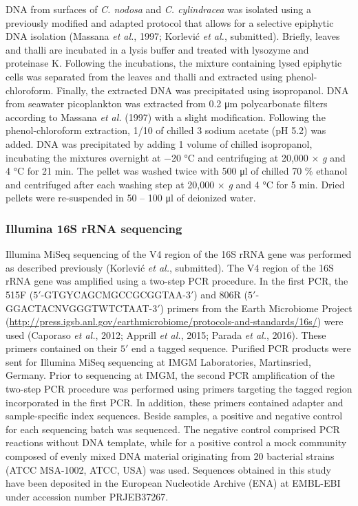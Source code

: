 \documentclass[12pt,]{article}
\begin{document}
DNA from surfaces of \emph{C. nodosa} and \emph{C. cylindracea} was
isolated using a previously modified and adapted protocol that allows
for a selective epiphytic DNA isolation (Massana \emph{et al.}, 1997;
Korlević \emph{et al.}, submitted). Briefly, leaves and thalli are
incubated in a lysis buffer and treated with lysozyme and proteinase K.
Following the incubations, the mixture containing lysed epiphytic cells
was separated from the leaves and thalli and extracted using
phenol-chloroform. Finally, the extracted DNA was precipitated using
isopropanol. DNA from seawater picoplankton was extracted from 0.2
\si{\um} polycarbonate filters according to Massana \emph{et al.} (1997)
with a slight modification. Following the phenol-chloroform extraction,
1/10 of chilled 3 \si{\Molar} sodium acetate (pH 5.2) was added. DNA was
precipitated by adding 1 volume of chilled isopropanol, incubating the
mixtures overnight at \num{-20} \si{\degreeCelsius} and centrifuging at
20,000 × \emph{g} and 4 \si{\degreeCelsius} for 21 \si{\minute}. The
pellet was washed twice with 500 \si{\ul} of chilled 70 \si{\percent}
ethanol and centrifuged after each washing step at 20,000 × \emph{g} and
4 \si{\degreeCelsius} for 5 \si{\minute}. Dried pellets were
re-suspended in 50 -- 100 \si{\ul} of deionized water.

\hypertarget{illumina-16s-rrna-sequencing}{%
\subsubsection{Illumina 16S rRNA
sequencing}\label{illumina-16s-rrna-sequencing}}

Illumina MiSeq sequencing of the V4 region of the 16S rRNA gene was
performed as described previously (Korlević \emph{et al.}, submitted).
The V4 region of the 16S rRNA gene was amplified using a two-step PCR
procedure. In the first PCR, the 515F
(\(5'\)-GTGYCAGCMGCCGCGGTAA-\(3'\)) and 806R
(\(5'\)-GGACTACNVGGGTWTCTAAT-\(3'\)) primers from the Earth Microbiome
Project
(\url{http://press.igsb.anl.gov/earthmicrobiome/protocols-and-standards/16s/})
were used (Caporaso \emph{et al.}, 2012; Apprill \emph{et al.}, 2015;
Parada \emph{et al.}, 2016). These primers contained on their \(5'\) end
a tagged sequence. Purified PCR products were sent for Illumina MiSeq
sequencing at IMGM Laboratories, Martinsried, Germany. Prior to
sequencing at IMGM, the second PCR amplification of the two-step PCR
procedure was performed using primers targeting the tagged region
incorporated in the first PCR. In addition, these primers contained
adapter and sample-specific index sequences. Beside samples, a positive
and negative control for each sequencing batch was sequenced. The
negative control comprised PCR reactions without DNA template, while for
a positive control a mock community composed of evenly mixed DNA
material originating from 20 bacterial strains (ATCC MSA-1002, ATCC,
USA) was used. Sequences obtained in this study have been deposited in
the European Nucleotide Archive (ENA) at EMBL-EBI under accession number
PRJEB37267.
\end{document}
